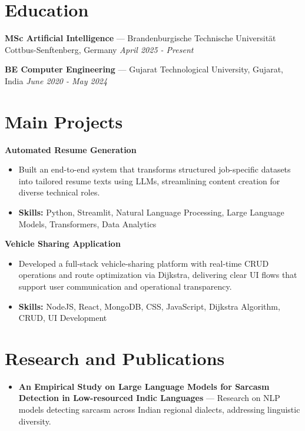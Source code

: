 \documentclass[a4paper,10pt]{article}
\begin{document}
\section*{Education}
\textbf{MSc Artificial Intelligence} — Brandenburgische Technische Universität Cottbus-Senftenberg, Germany \hfill \textit{April 2025 - Present}\par
\vspace{1.5pt}
\textbf{BE Computer Engineering} — Gujarat Technological University, Gujarat, India \hfill \textit{June 2020 - May 2024}\par

\section*{Main Projects}
\textbf{Automated Resume Generation}\par
\vspace{1pt}
\begin{itemize}
  \item Built an end-to-end system that transforms structured job-specific datasets into tailored resume texts using LLMs, streamlining content creation for diverse technical roles.
  \item \textbf{Skills:} Python, Streamlit, Natural Language Processing, Large Language Models, Transformers, Data Analytics
\end{itemize}
\vspace{3pt}
\textbf{Vehicle Sharing Application}\par
\vspace{1pt}
\begin{itemize}
  \item Developed a full-stack vehicle-sharing platform with real-time CRUD operations and route optimization via Dijkstra, delivering clear UI flows that support user communication and operational transparency.
  \item \textbf{Skills:} NodeJS, React, MongoDB, CSS, JavaScript, Dijkstra Algorithm, CRUD, UI Development
\end{itemize}

\section*{Research and Publications}
\begin{itemize}
\item \textbf{An Empirical Study on Large Language Models for Sarcasm Detection in Low-resourced Indic Languages} — Research on NLP models detecting sarcasm across Indian regional dialects, addressing linguistic diversity.
\end{itemize}
\end{document}
